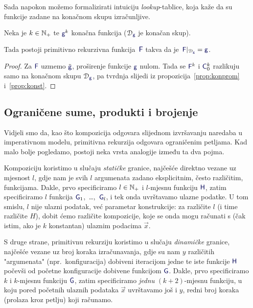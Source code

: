Sada napokon možemo formalizirati intuiciju \emph{lookup}-tablice, koja kaže da su funkcije zadane na konačnom skupu izračunljive. %

\begin{korolar}[{name=[konačne funkcije su proširive do primitivno rekurzivnih]}]\label{kor:kon0}
Neka je $k\in{\mathbb N}_+$ te $\f g^k$ konačna funkcija ($\dom{\f g}$ je konačan skup).
   
    Tada postoji primitivno rekurzivna funkcija\, $\f F$ takva da je\, $\f F|_{\dom{\f g}}=\f g$.
\end{korolar}
\begin{proof}
    Za $\f F$ uzmemo $\tilde{\f g}$, proširenje funkcije $\f g$ nulom. Tada se $\f F^k$ i $\f C_0^k$ razlikuju samo na konačnom skupu $\dom{\f g}$, pa tvrdnja slijedi iz propozicija~\ref{prop:konprom} i~\ref{prop:konst}. 
\end{proof}

\subsection{Ograničene sume, produkti i brojenje}\label{sec:sumprodcount}

Vidjeli smo da, kao što kompozicija odgovara slijednom izvršavanju naredaba u imperativnom modelu, primitivna rekurzija odgovara ograničenim petljama. Kad malo bolje pogledamo, postoji neka vrsta analogije između ta dva pojma.

Kompoziciju koristimo u slučaju \emph{statičke} granice, najčešće direktno vezane uz mjesnost $l$, gdje nam je svih $l$ argumenata zadano eksplicitnim, često različitim, funkcijama. Dakle, prvo specificiramo $l\in{\mathbb N}_+$ i $l$-mjesnu funkciju $\f H$, zatim specificiramo $l$ funkcija $\f G_1$,~\ldots,~$\f G_l$, i tek onda uvrštavamo ulazne podatke. U tom smislu, $l$ nije ulazni podatak, već parametar konstrukcije: za različite $l$ (i time različite $H$), dobit ćemo različite kompozicije, koje se onda mogu računati s (čak istim, ako je $k$ konstantan) ulaznim podacima $\vec x$.

S druge strane, primitivnu rekurziju koristimo u slučaju \emph{dinamičke} granice, naj\-češ\-će vezane uz broj koraka izračunavanja, gdje su nam $y$ različitih "argumenata" (npr.\ konfiguracija) dobiveni iteracijom jedne te iste funkcije $\f H$ počevši od početne konfiguracije dobivene funkcijom $\f G$. Dakle, prvo specificiramo $k$ i $k$-mjesnu funkciju $\f G$, zatim specificiramo \emph{jednu} $(k+2)$-mjesnu funkciju, u koju pored početnih ulaznih podataka $\vec x$ uvrštavamo još i $y$, redni broj koraka (prolaza kroz petlju) koji računamo.

